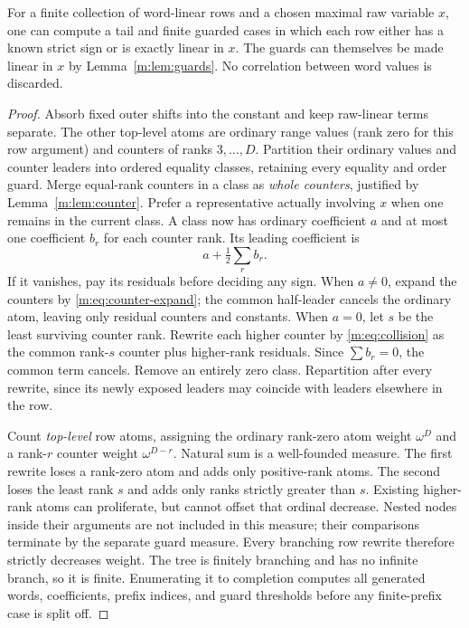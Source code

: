 \begin{lemma}\label{m:lem:row}
For a finite collection of word-linear rows and a chosen maximal raw
variable $x$, one can compute a tail and finite guarded cases in which
each row either has a known strict sign or is exactly linear in $x$.
The guards can themselves be made linear in $x$ by
Lemma~\ref{m:lem:guards}. No correlation between word values is discarded.
\end{lemma}
\begin{proof}
Absorb fixed outer shifts into the constant and keep raw-linear terms
separate. The other top-level atoms are ordinary range values (rank zero
for this row argument) and counters of ranks $3,\ldots,D$. Partition their
ordinary values and counter leaders into ordered equality classes, retaining
every equality and order guard. Merge equal-rank counters in a class as
\emph{whole counters}, justified by Lemma~\ref{m:lem:counter}. Prefer a
representative actually involving $x$ when one remains in the current
class. A class now has ordinary coefficient $a$ and at most one coefficient
$b_r$ for each counter rank. Its leading coefficient is
\[
 a+\tfrac12\sum_r b_r.
\]
If it vanishes, pay its residuals before deciding any sign. When $a\ne0$,
expand the counters by \eqref{m:eq:counter-expand}; the common half-leader
cancels the ordinary atom, leaving only residual counters and constants.
When $a=0$, let $s$ be the least surviving counter rank. Rewrite each
higher counter by \eqref{m:eq:collision} as the common rank-$s$ counter plus
higher-rank residuals. Since $\sum b_r=0$, the common term cancels. Remove
an entirely zero class. Repartition after every rewrite, since its newly
exposed leaders may coincide with leaders elsewhere in the row.

Count \emph{top-level} row atoms, assigning the ordinary rank-zero atom
weight $\omega^D$ and a rank-$r$ counter weight $\omega^{D-r}$.
Natural sum is a well-founded measure. The first rewrite loses a rank-zero
atom and adds only positive-rank atoms. The second loses the least rank
$s$ and adds only ranks strictly greater than $s$. Existing higher-rank
atoms can proliferate, but cannot offset that ordinal decrease. Nested
nodes inside their arguments are not included in this measure; their
comparisons terminate by the separate guard measure. Every branching row
rewrite therefore strictly decreases weight. The tree is finitely
branching and has no infinite branch, so it is finite. Enumerating it to
completion computes all generated words, coefficients, prefix indices,
and guard thresholds before any finite-prefix case is split off.


\end{proof}
